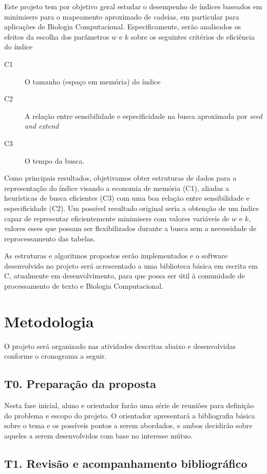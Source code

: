 \documentclass[12pt, a4paper, oneside]{article}
\begin{document}
Este projeto tem por objetivo geral estudar o desempenho de índices baseados em minimisers para o mapeamento aproximado de cadeias, em particular para aplicações de Biologia Computacional. Especificamente, serão analisados  os efeitos da escolha dos parâmetros $w$ e $k$ sobre os seguintes critérios de eficiência do índice
\begin{description}
\item[C1] O tamanho (espaço em memória) do índice
\item[C2] A relação entre sensibilidade e especificidade na busca aproximada por \emph{seed and extend}
\item[C3] O tempo da busca.
\end{description}
Como principais resultados, objetivamos obter estruturas de dados para a representação do índice visando a economia de memória (C1), aliadas a heurísticas de busca eficientes (C3) com uma boa relação entre sensibilidade e especificidade (C2). Um possível resultado original seria a obtenção de um índice capaz de representar eficientemente minimisers com valores variáveis de $w$ e $k$, valores esses que possam ser flexibilizados durante a busca sem a necessidade de reprocessamento das tabelas.

As estruturas e algoritmos propostos serão implementados e o  software desenvolvido no projeto será acrescentado a uma biblioteca básica em escrita em C, atualmente em desenvolvimento, para que possa ser útil à comunidade de processamento de texto e Biologia Computacional.


\clearpage
\section{Metodologia}

O projeto será organizado nas atividades descritas abaixo e desenvolvidas conforme o cronograma a seguir.

\subsection*{T0. Preparação da proposta}

Nesta fase inicial, aluno e orientador farão uma série de reuniões para definição do problema e escopo do projeto. O orientador apresentará a bibliografia básica sobre o tema e os possíveis pontos a serem abordados, e ambos decidirão sobre aqueles a serem desenvolvidos com base no  interesse mútuo.

\subsection*{T1. Revisão e acompanhamento bibliográfico}
\end{document}
